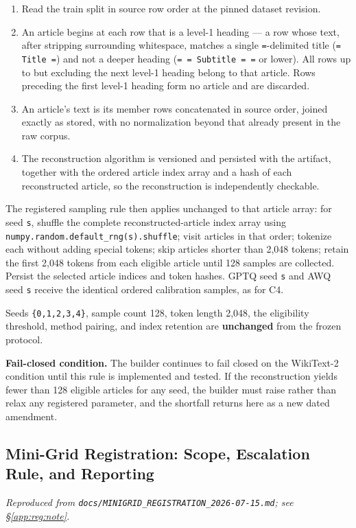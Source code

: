 \begin{enumerate}
\item Read the train split in source row order at the pinned dataset revision.
\item An article begins at each row that is a level-1 heading --- a row whose text, after stripping surrounding whitespace, matches a single \texttt{=}-delimited title (\texttt{= Title =}) and not a deeper heading (\texttt{= = Subtitle = =} or lower). All rows up to but excluding the next level-1 heading belong to that article. Rows preceding the first level-1 heading form no article and are discarded.
\item An article's text is its member rows concatenated in source order, joined exactly as stored, with no normalization beyond that already present in the raw corpus.
\item The reconstruction algorithm is versioned and persisted with the artifact, together with the ordered article index array and a hash of each reconstructed article, so the reconstruction is independently checkable.
\end{enumerate}
The registered sampling rule then applies unchanged to that article array: for seed \texttt{s}, shuffle the complete reconstructed-article index array using \texttt{numpy.random.default\_rng(s).shuffle}; visit articles in that order; tokenize each without adding special tokens; skip articles shorter than 2,048 tokens; retain the first 2,048 tokens from each eligible article until 128 samples are collected. Persist the selected article indices and token hashes. GPTQ seed \texttt{s} and AWQ seed \texttt{s} receive the identical ordered calibration samples, as for C4.

Seeds \texttt{\{0,1,2,3,4\}}, sample count 128, token length 2,048, the eligibility threshold, method pairing, and index retention are \textbf{unchanged} from the frozen protocol.

\textbf{Fail-closed condition.} The builder continues to fail closed on the WikiText-2 condition until this rule is implemented and tested. If the reconstruction yields fewer than 128 eligible articles for any seed, the builder must raise rather than relax any registered parameter, and the shortfall returns here as a new dated amendment.


\subsection{Mini-Grid Registration: Scope, Escalation Rule, and Reporting}
\label{app:reg:minigrid}  %
\emph{Reproduced from \texttt{docs/\allowbreak{}MINIGRID\_REGISTRATION\_2026-\allowbreak{}07-\allowbreak{}15.md}; see \S\ref{app:reg:note}.}  %

